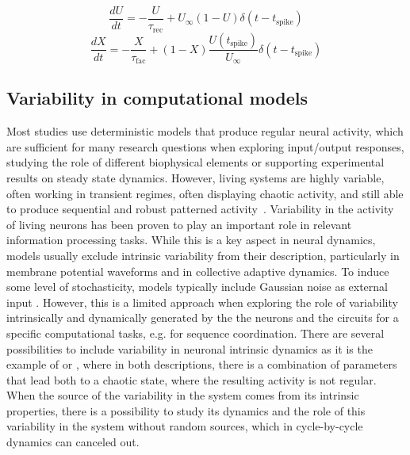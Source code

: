 \begin{equation}
	\frac{dU}{dt} = -\frac{U}{\tau_{\text{rec}}} + U_{\infty}(1 - U) \delta(t - t_{\text{spike}})
	\label{eq:tsodyks1}
\end{equation}
\begin{equation}
	\frac{dX}{dt} = -\frac{X}{\tau_{\text{fac}}} + (1 - X) \frac{U(t_{\text{spike}})}{U_{\infty}} \delta(t - t_{\text{spike}})
	\label{eq:tsodyks2}
\end{equation}


\subsection{Variability in computational models}

 Most studies use deterministic models that produce regular neural activity, which are sufficient for many research questions when exploring input/output responses, studying the role of different biophysical elements or supporting experimental results on steady state dynamics. However, living systems are highly variable, often working in transient regimes, often displaying chaotic activity, and still able to produce sequential and robust patterned activity~\parencite{selverston_reliable_2000}. Variability in the activity of living neurons has been proven to play an important role in relevant information processing tasks. While this is a key aspect in neural dynamics, models usually exclude intrinsic variability from their description,  particularly in membrane potential waveforms and in collective adaptive dynamics. To induce some level of stochasticity, models typically include Gaussian noise as external input \parencite{linaro_accurate_2011,pezo_diffusion_2014,zheng_spontaneous_2020}. However, this is a limited approach when exploring the role of variability intrinsically and dynamically generated by the the neurons and the circuits for a specific computational tasks, e.g. for sequence coordination. There are several possibilities to include variability in neuronal intrinsic dynamics as it is the example of \cite{hindmarsh_model_1984} or \cite{komendantov_deterministic_1996}, where in both descriptions, there is a combination of parameters that lead both to a chaotic state, where the resulting activity is not regular. When the source of the variability in the system comes from its intrinsic properties, there is a possibility to study its dynamics and the role of this variability in the system without random sources, which in cycle-by-cycle dynamics can canceled out.


